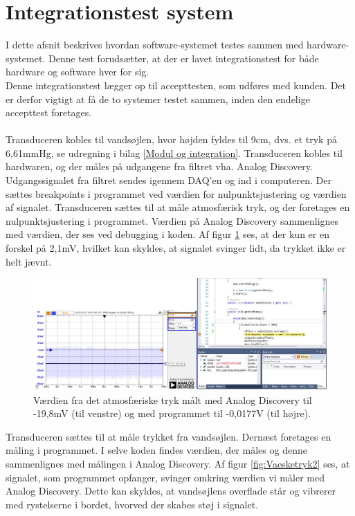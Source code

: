\section{Integrationstest system}
I dette afsnit beskrives hvordan software-systemet testes sammen med hardware-systemet. Denne test forudsætter, at der er lavet integrationstest for både hardware og software hver for sig. \\
Denne integrationstest lægger op til accepttesten, som udføres med kunden. Det er derfor vigtigt at få de to systemer testet sammen, inden den endelige accepttest foretages. \\
\\
Transduceren kobles til vandsøjlen, hvor højden fyldes til 9cm, dvs. et tryk på 6,61mmHg, se udregning i bilag \ref{Modul og integration}. Transduceren kobles til hardwaren, og der måles på udgangene fra filtret vha. Analog Discovery. Udgangssignalet fra filtret sendes igennem DAQ’en og ind i computeren. Der sættes breakpoints i programmet ved værdien for nulpunktsjustering og værdien af signalet. 
Transduceren sættes til at måle atmosfærisk tryk, og der foretages en nulpunktsjustering i programmet. Værdien på Analog Discovery sammenlignes med værdien, der ses ved debugging i koden. Af figur \ref{fig:Atmosfaerisktryk} ses, at der kun er en forskel på 2,1mV, hvilket kan skyldes, at signalet svinger lidt, da trykket ikke er helt jævnt.

\begin{figure}[H]
	\centering
	\includegraphics[width=1.2\textwidth]{Figurer/Test/Nulpunkt}
	\caption{Værdien fra det atmosfæriske tryk målt med Analog Discovery til -19,8mV (til venstre) og med programmet til -0,0177V (til højre).}
	\label{fig:Atmosfaerisktryk}
\end{figure}

Transduceren sættes til at måle trykket fra vandsøjlen. Dernæst foretages en måling i programmet. I selve koden findes værdien, der måles og denne sammenlignes med målingen i Analog Discovery. Af figur \ref{fig:Vaesketryk2} ses, at signalet, som programmet opfanger, svinger omkring værdien vi måler med Analog Discovery. Dette kan skyldes, at vandsøjlens overflade står og vibrerer med rystelserne i bordet, hvorved der skabes støj i signalet.

